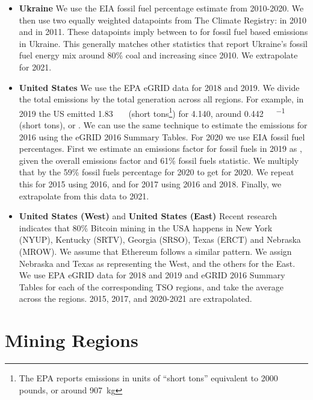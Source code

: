 \begin{appendices}
\begin{itemize}
    \item \textbf{Ukraine} We use the EIA fossil fuel percentage estimate from 2010-2020. We then use two equally weighted datapoints from The Climate Registry\cite{the_climate_registry_default_2021}:  in 2010 and  in 2011. These datapoints imply between  to  for fossil fuel based emissions in Ukraine. This generally matches other statistics\cite{wikipedia_contributors_energy_2021}\cite{the_shift_project_shift_2020} that report Ukraine's fossil fuel energy mix around 80\% coal and increasing since 2010. We extrapolate for 2021.
    
    \item \textbf{United States} We use the EPA eGRID data for 2018 and 2019\cite{us_epa_data_2020}. We divide the total emissions by the total generation across all regions. For example, in 2019 the US emitted \SI{1.83}{\giga\ton\COtwo} (short tons\footnote{The EPA reports \COtwo{} emissions in units of ``short tons'' equivalent to 2000 pounds, or around \SI{907}{\kilo\gram}}) for \SI{4,140}{\TWh}, around \SI{0.442}{\ton\COtwoe\per{\mega\watt\hour}} (short tons), or . We can use the same technique to estimate the emissions for 2016 using the eGRID 2016 Summary Tables\cite{us_epa_download_2020}. For 2020 we use EIA fossil fuel percentages. First we estimate an emissions factor for fossil fuels in 2019 as , given the  overall emissions factor and 61\% fossil fuels statistic. We multiply that by the 59\% fossil fuels percentage for 2020 to get  for 2020. We repeat this for 2015 using 2016, and for 2017 using 2016 and 2018. Finally, we extrapolate from this data to 2021.
    
    \item \textbf{United States (West)} and \textbf{United States (East)} Recent research\cite{sigalos_bitcoin_2021} indicates that 80\% Bitcoin mining in the USA happens in New York (NYUP), Kentucky (SRTV), Georgia (SRSO), Texas (ERCT) and Nebraska (MROW). We assume that Ethereum follows a similar pattern. We assign Nebraska and Texas as representing the West, and the others for the East. We use EPA eGRID data for 2018 and 2019 and eGRID 2016 Summary Tables for each of the corresponding TSO regions, and take the average across the regions. 2015, 2017, and 2020-2021 are extrapolated.

\end{itemize}

\section{Mining Regions}
\label{appendix:mining-regions}


\end{appendices}
